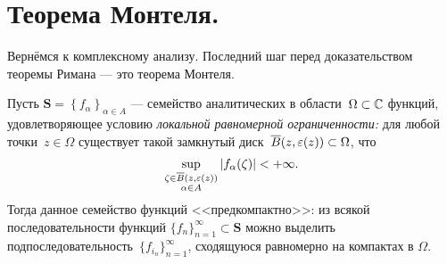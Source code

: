 \documentclass[../complex-analysis.tex]{subfiles}
\begin{document}
\newpage
\section{Теорема Монтеля.}

Вернёмся к комплексному анализу. Последний шаг перед доказательством теоремы Римана --- это теорема Монтеля.

\begin{thm}[Монтеля]
 \label{theorem:montel}
 Пусть $ \mathbf S = \left\{f_\alpha\right\}_{\alpha \in A} $  --- семейство аналитических в области~$ \Omega \subset \mathbb{C} $ функций, удовлетворяющее условию \emph{локальной равномерной ограниченности:} для любой точки~$ z \in \Omega $ существует такой замкнутый диск~$ \overline B(z,\varepsilon(z)) \subset \Omega$, что
 \begin{align}
  \label{eq:Local Uniform Bound:Montel Theorem}
  \sup_{\substack{\zeta \in \overline B(z, \varepsilon(z)) \\ \alpha \in A}} \left| f_\alpha(\zeta) \right| < +\infty.
 \end{align} Тогда данное семейство функций <<предкомпактно>>: из всякой последовательности функций $ \{f_{n}\}_{n=1}^{\infty} \subset \mathbf S  $ можно выделить подпоследовательность~$ \{f_{i_n}\}_{n=1}^{\infty}  $, сходящуюся равномерно на компактах в $ \Omega $.
\end{thm}
\end{document}
